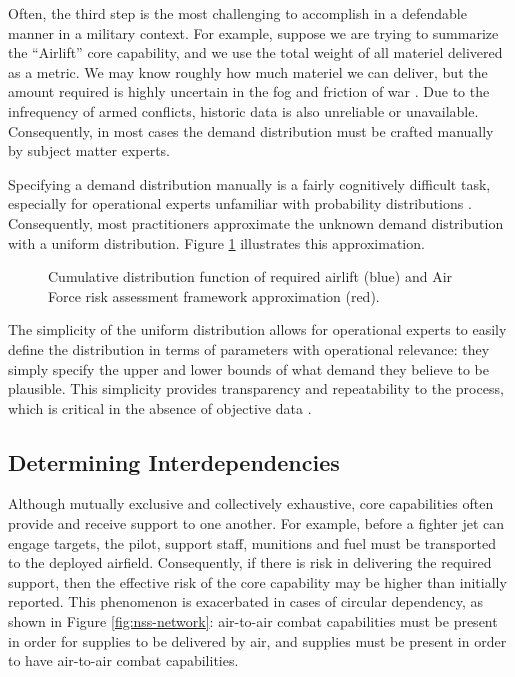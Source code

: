 \documentclass{article}
\begin{document}
Often, the third step is the most challenging to accomplish in a defendable manner in a military context. For example, suppose we are trying to summarize the ``Airlift'' core capability, and we use the total weight of all materiel delivered as a metric.  We may know roughly how much materiel we can deliver, but the amount required is highly uncertain in the fog and friction of war \citep{clausewitz}. Due to the infrequency of armed conflicts, historic data is also unreliable or unavailable. Consequently, in most cases the demand distribution must be crafted manually by subject matter experts. 

Specifying a demand distribution manually is a fairly cognitively difficult task, especially for operational experts unfamiliar with probability distributions \citep{gallagher2016improving}. Consequently, most practitioners approximate the unknown demand distribution with a uniform distribution. Figure \ref{fig:airlift-risk} illustrates this approximation. 
\begin{figure}
\centering
{}
\label{fig:airlift-risk}
\caption{Cumulative distribution function of required airlift (blue) and Air Force risk assessment framework approximation (red).}
\end{figure}
The simplicity of the uniform distribution allows for operational experts to easily define the distribution in terms of parameters with operational relevance: they simply specify the upper and lower bounds of what demand they believe to be plausible. This simplicity provides transparency and repeatability to the process, which is critical in the absence of objective data \citep{gallagher2016improving}.

\subsection{Determining Interdependencies}
Although mutually exclusive and collectively exhaustive, core capabilities often provide and receive support to one another. For example, before a fighter jet can engage targets, the pilot, support staff, munitions and fuel must be transported to the deployed airfield. Consequently, if there is risk in delivering the required support, then the effective risk of the core capability may be higher than initially reported. This phenomenon is exacerbated in cases of circular dependency, as shown in Figure \ref{fig:nss-network}: air-to-air combat capabilities must be present in order for supplies to be delivered by air, and supplies must be present in order to have air-to-air combat capabilities.
\end{document}

